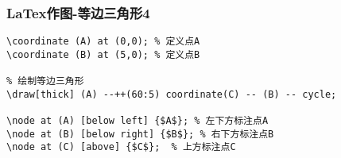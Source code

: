 \begin{frame}[fragile]
\frametitle{LaTex作图-等边三角形4}

\begin{lstlisting}
\coordinate (A) at (0,0); % 定义点A 
\coordinate (B) at (5,0); % 定义点B

% 绘制等边三角形
\draw[thick] (A) --++(60:5) coordinate(C) -- (B) -- cycle;

\node at (A) [below left] {$A$}; % 左下方标注点A
\node at (B) [below right] {$B$}; % 右下方标注点B
\node at (C) [above] {$C$};  % 上方标注点C
\end{lstlisting}
\end{frame}

